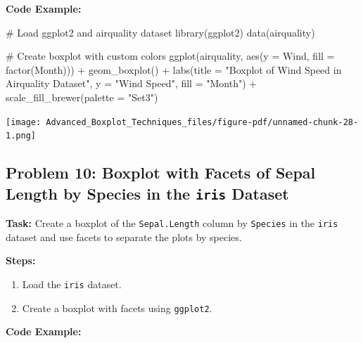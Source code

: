 \documentclass[
  letterpaper,
  DIV=11,
  numbers=noendperiod]{scrreprt}
\newenvironment{Shaded}{\begin{snugshade}}{\end{snugshade}}
\newcommand{\AttributeTok}[1]{\textcolor[rgb]{0.40,0.45,0.13}{#1}}
\newcommand{\CommentTok}[1]{\textcolor[rgb]{0.37,0.37,0.37}{#1}}
\newcommand{\FunctionTok}[1]{\textcolor[rgb]{0.28,0.35,0.67}{#1}}
\newcommand{\NormalTok}[1]{\textcolor[rgb]{0.00,0.23,0.31}{#1}}
\newcommand{\SpecialCharTok}[1]{\textcolor[rgb]{0.37,0.37,0.37}{#1}}
\newcommand{\StringTok}[1]{\textcolor[rgb]{0.13,0.47,0.30}{#1}}
\providecommand{\tightlist}{%
  \setlength{\itemsep}{0pt}\setlength{\parskip}{0pt}}\usepackage{longtable,booktabs,array}
\begin{document}
\textbf{Code Example:}

\begin{Shaded}
\begin{Highlighting}[]
\CommentTok{\# Load ggplot2 and airquality dataset}
\FunctionTok{library}\NormalTok{(ggplot2)}
\FunctionTok{data}\NormalTok{(airquality)}

\CommentTok{\# Create boxplot with custom colors}
\FunctionTok{ggplot}\NormalTok{(airquality, }\FunctionTok{aes}\NormalTok{(}\AttributeTok{y =}\NormalTok{ Wind, }\AttributeTok{fill =} \FunctionTok{factor}\NormalTok{(Month))) }\SpecialCharTok{+}
  \FunctionTok{geom\_boxplot}\NormalTok{() }\SpecialCharTok{+}
  \FunctionTok{labs}\NormalTok{(}\AttributeTok{title =} \StringTok{"Boxplot of Wind Speed in Airquality Dataset"}\NormalTok{, }\AttributeTok{y =} \StringTok{"Wind Speed"}\NormalTok{, }\AttributeTok{fill =} \StringTok{"Month"}\NormalTok{) }\SpecialCharTok{+}
  \FunctionTok{scale\_fill\_brewer}\NormalTok{(}\AttributeTok{palette =} \StringTok{"Set3"}\NormalTok{)}
\end{Highlighting}
\end{Shaded}

\texttt{[image: Advanced\_Boxplot\_Techniques\_files/figure-pdf/unnamed-chunk-28-1.png]}

\subsection*{\texorpdfstring{Problem 10: Boxplot with Facets of Sepal
Length by Species in the \texttt{iris}
Dataset}{Problem 10: Boxplot with Facets of Sepal Length by Species in the iris Dataset}}\label{problem-10-boxplot-with-facets-of-sepal-length-by-species-in-the-iris-dataset}

\textbf{Task:} Create a boxplot of the \texttt{Sepal.Length} column by
\texttt{Species} in the \texttt{iris} dataset and use facets to separate
the plots by species.

\textbf{Steps:}

\begin{enumerate}
\def\labelenumi{\arabic{enumi}.}
\tightlist
\item
  Load the \texttt{iris} dataset.
\item
  Create a boxplot with facets using \texttt{ggplot2}.
\end{enumerate}

\textbf{Code Example:}
\end{document}
